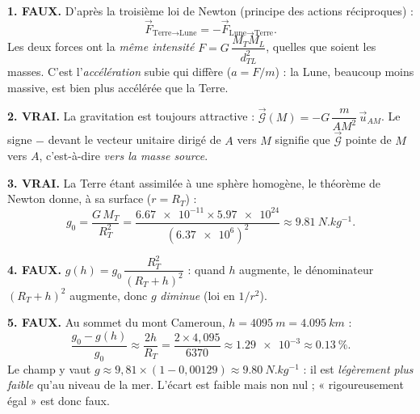 \documentclass[11pt]{article}
\begin{document}
\begin{corrige}
\textbf{1. FAUX.} D'après la troisième loi de Newton (principe des actions réciproques) :
\[
\vec{F}_{\text{Terre}\to\text{Lune}} = -\vec{F}_{\text{Lune}\to\text{Terre}}.
\]
Les deux forces ont la \emph{même intensité} $F = G\,\dfrac{M_T M_L}{d_{TL}^2}$, quelles que soient les masses. C'est l'\emph{accélération} subie qui diffère ($a = F/m$) : la Lune, beaucoup moins massive, est bien plus accélérée que la Terre.

\textbf{2. VRAI.} La gravitation est toujours attractive : $\vec{\mathcal{G}}(M) = -G\,\dfrac{m}{AM^2}\,\vec{u}_{AM}$. Le signe $-$ devant le vecteur unitaire dirigé de $A$ vers $M$ signifie que $\vec{\mathcal{G}}$ pointe de $M$ vers $A$, c'est-à-dire \emph{vers la masse source}.

\textbf{3. VRAI.} La Terre étant assimilée à une sphère homogène, le théorème de Newton donne, à sa surface ($r = R_T$) :
\[
g_0 = \frac{G\,M_T}{R_T^2} = \frac{\num{6,67e-11}\times\num{5,97e24}}{(\num{6,37e6})^2} \approx \SI{9,81}{N.kg^{-1}}.
\]

\textbf{4. FAUX.} $g(h) = g_0\,\dfrac{R_T^2}{(R_T+h)^2}$ : quand $h$ augmente, le dénominateur $(R_T+h)^2$ augmente, donc $g$ \emph{diminue} (loi en $1/r^2$).

\textbf{5. FAUX.} Au sommet du mont Cameroun, $h = \SI{4095}{m} = \SI{4,095}{km}$ :
\[
\frac{g_0 - g(h)}{g_0} \approx \frac{2h}{R_T} = \frac{2\times 4,095}{6370} \approx \num{1,29e-3} \approx \SI{0,13}{\%}.
\]
Le champ y vaut $g \approx 9,81\times(1 - 0,00129) \approx \SI{9,80}{N.kg^{-1}}$ : il est \emph{légèrement plus faible} qu'au niveau de la mer. L'écart est faible mais non nul ; « rigoureusement égal » est donc faux.
\end{corrige}
\end{document}
